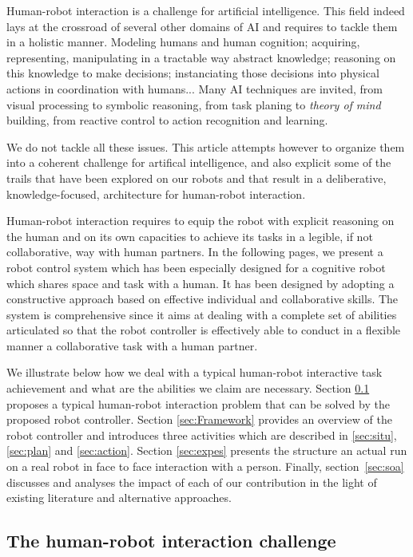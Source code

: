 \documentclass[preprint,5p]{elsarticle}
\begin{document}
Human-robot interaction is a challenge for artificial intelligence. This field
indeed lays at the crossroad of several other domains of AI and requires to
tackle them in a holistic manner. Modeling humans and human cognition;
acquiring, representing, manipulating in a tractable way abstract knowledge;
reasoning on this knowledge to make decisions; instanciating those decisions
into physical actions in coordination with humans... Many AI techniques are
invited, from visual processing to symbolic reasoning, from task planing to
\emph{theory of mind} building, from reactive control to action recognition and
learning.

We do not tackle all these issues. This article attempts however to organize
them into a coherent challenge for artifical intelligence, and also explicit
some of the trails that have been explored on our robots and that result in a
deliberative, knowledge-focused, architecture for human-robot interaction.

Human-robot interaction requires to equip the robot with explicit reasoning on
the human and on its own capacities to achieve its tasks in a legible, if not
collaborative, way with human partners. In the following pages, we present a
robot control system which has been especially designed for a cognitive robot
which shares space and task with a human. It has been designed by adopting a
constructive approach based on effective individual and collaborative skills.
The system is comprehensive since it aims at dealing with a complete set of
abilities articulated so that the robot controller is effectively able to
conduct in a flexible manner a collaborative task with a human partner.

We illustrate below how we deal with a typical human-robot interactive task
achievement and what are the abilities we claim are necessary. Section
\ref{sec:problem} proposes a typical human-robot interaction problem that can
be solved by the proposed robot controller. Section
\ref{sec:Framework} provides an overview of the robot controller and
introduces three activities which are described in \ref{sec:situ},
\ref{sec:plan} and \ref{sec:action}. Section \ref{sec:expes}
presents the structure an actual run on a real robot in face to face interaction with a
person. Finally, section~\ref{sec:soa} discusses and analyses the impact of
each of our contribution in the light of existing literature and alternative
approaches.

\subsection{The human-robot interaction challenge}\label{sec:problem}
\end{document}

